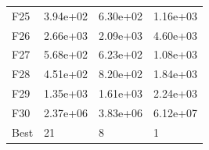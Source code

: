 \begin{table}[H]
\begin{minipage}{.5\linewidth}
\begin{tabular}{llll}
            F25  &  3.94e+02 &  6.30e+02 &  1.16e+03 \\
            F26  &  2.66e+03 &  2.09e+03 &  4.60e+03 \\
            F27  &  5.68e+02 &  6.23e+02 &  1.08e+03 \\
            F28  &  4.51e+02 &  8.20e+02 &  1.84e+03 \\
            F29  &  1.35e+03 &  1.61e+03 &  2.24e+03 \\
            F30  &  2.37e+06 &  3.83e+06 &  6.12e+07 \\
            Best &        21 &         8 &         1 \\
            \bottomrule
            \end{tabular}
            
    \end{minipage} 
\end{table}

